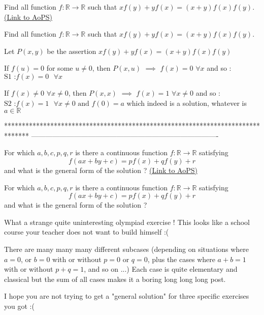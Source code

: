 \begin{problem}
	Find all function $f: \mathbb{R}\to\mathbb{R}$ such that $xf(y)+yf(x)=(x+y)f(x)f(y)$.
	\flushright \href{https://artofproblemsolving.com/community/c6h581275}{(Link to AoPS)}
\end{problem}



\begin{solution}
	\begin{tcolorbox}Find all function $f: \mathbb{R}\to\mathbb{R}$ such that $xf(y)+yf(x)=(x+y)f(x)f(y)$.\end{tcolorbox}
Let $P(x,y)$ be the assertion $xf(y)+yf(x)=(x+y)f(x)f(y)$

If $f(u)=0$ for some $u\ne 0$, then $P(x,u)$ $\implies$ $f(x)=0$ $\forall x$ and so :
$\boxed{\text{S1 :}f(x)=0\text{  }\forall x}$

If $f(x)\ne 0$ $\forall x\ne 0$, then $P(x,x)$ $\implies$ $f(x)=1$ $\forall x\ne 0$ and so :
$\boxed{\text{S2 :}f(x)=1\text{  }\forall x\ne 0\text{ and }f(0)=a}$ which indeed is a solution, whatever is $a\in\mathbb R$
\end{solution}
*******************************************************************************
-------------------------------------------------------------------------------

\begin{problem}
	For which $a,b,c,p,q,r $ is there a continuous function $f:\mathbb R\to\mathbb R$ satisfying \[f(ax+by+c)=pf(x)+qf(y)+r\] and what is the general form of the solution ?
	\flushright \href{https://artofproblemsolving.com/community/c6h581440}{(Link to AoPS)}
\end{problem}



\begin{solution}
	\begin{tcolorbox}For which $a,b,c,p,q,r $ is there a continuous function $f:\mathbb R\to\mathbb R$ satisfying \[f(ax+by+c)=pf(x)+qf(y)+r\] and what is the general form of the solution ?\end{tcolorbox}
What a strange quite uninteresting olympiad exercise !
This looks like a school course your teacher does not want to build himself :(

There are many many many different subcases (depending on situations where $a=0$, or $b=0$ with or without $p=0$ or $q=0$, plus the cases where $a+b=1$ with or without $p+q=1$, and so on ...)
Each case is quite elementary and classical but the sum of all cases makes it a boring long long long post.

I hope you are not trying to get a "general solution" for three specific exercises you got :(
\end{solution}



